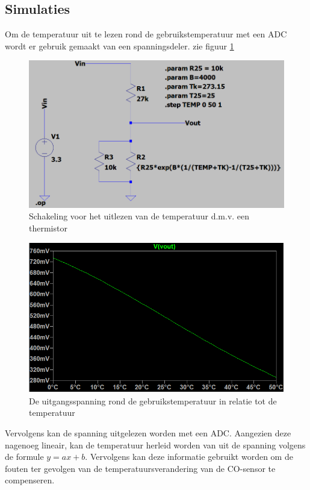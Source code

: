 \documentclass[a4paper, 11pt]{article} %
\begin{document}
	\subsection{Simulaties}
	Om de temperatuur uit te lezen rond de gebruikstemperatuur met een ADC wordt er gebruik gemaakt van een spanningsdeler. zie figuur \ref{fig::thermistor_circ}
	\begin{figure}[h!]
		\centering
		\hspace*{-1cm} 
		\includegraphics[width=1\linewidth]{../Media/thermistor_circ.PNG}
		\caption{Schakeling voor het uitlezen van de temperatuur d.m.v. een thermistor}
		\label{fig::thermistor_circ}
	\end{figure}
	\begin{figure}[h!]
		\centering
		\hspace*{-1cm} 
		\includegraphics[width=1\linewidth]{../Media/thermistor_sim.PNG}
		\caption{De uitgangsspanning rond de gebruikstemperatuur in relatie tot de temperatuur}
		\label{fig::thermistor_sim}
	\end{figure}
	\newpage
	Vervolgens kan de spanning uitgelezen worden met een ADC. Aangezien deze nagenoeg lineair, kan de temperatuur herleid worden van uit de spanning volgens de formule \begin{math}
	y = ax + b
	\end{math}. Vervolgens kan deze informatie gebruikt worden om de fouten ter gevolgen van de temperatuursverandering van de CO-sensor te compenseren.
	\newpage
	
\end{document}

